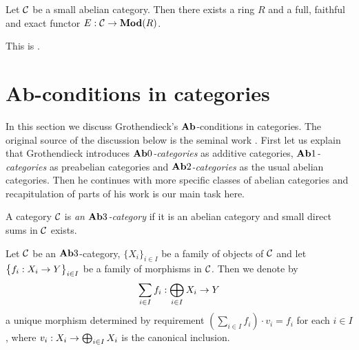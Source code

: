 \begin{theorem}\label{theorem:Freyd_Mitchel_embedding}
Let ${\mathcal C}$ be a small abelian category. Then there exists a ring $R$ and a full, faithful and exact functor $E:{\mathcal C}\rightarrow \mathbf{Mod}(R)$.
\end{theorem}
\noindent
This is {\cite[Theorem 7.34]{freyd1964abelian}}.

\section{\textbf{Ab}-conditions in categories}
\noindent
In this section we discuss Grothendieck's $\mathbf{Ab}$-conditions in categories. The original source of the discussion below is the seminal work \cite{grothendieck1957}. First let us explain that Grothendieck introduces \textit{$\mathbf{Ab}0$-categories} as additive categories, \textit{$\mathbf{Ab}1$-categories} as preabelian categories and \textit{$\mathbf{Ab}2$-categories} as the usual abelian categories. Then he continues with more specific classes of abelian categories and recapitulation of parts of his work is our main task here.

\begin{definition}
A category ${\mathcal C}$ is \textit{an $\mathbf{Ab}3$-category} if it is an abelian category and small direct sums in ${\mathcal C}$ exists.
\end{definition}
\noindent
Let ${\mathcal C}$ be an $\mathbf{Ab}3$-category, $\{X_i\}_{i\in I}$ be a family of objects of ${\mathcal C}$ and let $\big\{f_i:X_i\rightarrow Y\big\}_{i\in I}$ be a family of morphisms in ${\mathcal C}$. Then we denote by 
$$\sum_{i\in I}f_i:\bigoplus_{i\in I}X_i\rightarrow Y$$
a unique morphism determined by requirement $\left(\sum_{i\in I}f_i\right)\cdot v_i = f_i$ for each $i\in I$, where $v_i:X_i\rightarrow \bigoplus_{i\in I}X_i$ is the canonical inclusion.

